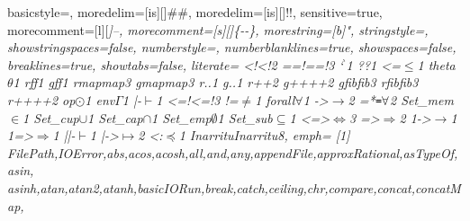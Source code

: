  {
	basicstyle=\ttfamily\codesize,
	moredelim=[is][\showfocus]{\#}{\#},
	moredelim=[is][\showlogic]{!}{!},
	sensitive=true,
	morecomment=[l][\color{gray_ulisses}\ttfamily\itshape\codesize]{--},
	morecomment=[s][\color{gray_ulisses}\ttfamily\itshape\codesize]{\{-}{-\}},
	morestring=[b]",
	stringstyle=\color{haskellstr},
	showstringspaces=false,
	numberstyle=\codesize,
	numberblanklines=true,
	showspaces=false,
	breaklines=true,
	showtabs=false,
  literate={
	         {<!}{{{\color{lcolor}<!}}}2
           {==!}{{{\color{lcolor}==!}}}3
           {`}{{{$^{\backprime}{}$}}}1
           {?}{{{\color{lcolor}?}}}1
           {<=}{{$\leq$}}1
           {theta}{{$\theta$}}1
           {rf}{{{\color{lappcolor}f}}}1
           {gf}{{{\color{lappascolor}f}}}1
           {rmap}{{{\color{lappcolor}map}}}3
           {gmap}{{{\color{lappascolor}map}}}3
           {r.}{{{\color{lappcolor}.}}}1
           {g.}{{{\color{lappascolor}.}}}1
           {r++}{{{\showfocus{++}}}}2
           {g++}{{{\color{lappascolor}++}}}2
           {gfib}{{{\color{lappascolor}fib}}}3
           {rfib}{{{\color{lappcolor}fib}}}3
           {r++}{{{\color{lappcolor}++}}}2
           {op}{{$\odot$}}1
           {env}{{$\Gamma$}}1
           {|-}{{$\vdash$}}1
           {<=!}{{{\color{lcolor}<=!}}}3
           {!=}{{$\neq$}}1
           {forall}{{$\forall$}}1
           {->}{{$\rightarrow$}}2
           {=*}{{$\texttt{=}\forall$}}2
           {Set_mem}{{$\in$}}1
           {Set_cup}{{$\cup$}}1
           {Set_cap}{{$\cap$}}1
           {Set_emp}{{$\emptyset$}}1
           {Set_sub}{{$\subseteq$}}1
           {<=>}{{$\Leftrightarrow$}}3
           {=>}{{$\Rightarrow$}}2
           {1->}{{$\rightarrow$}}1
           {1=>}{{$\Rightarrow$}}1
           {||-}{{$\vdash$}}1
           {|->}{{$\mapsto$}}2
           {<:}{{$\preceq$}}1
           {Inarritu}{Inarritu}8},
	emph=
	{[1]
		FilePath,IOError,abs,acos,acosh,all,and,any,appendFile,approxRational,asTypeOf,asin,
		asinh,atan,atan2,atanh,basicIORun,break,catch,ceiling,chr,compare,concat,concatMap,
}}

